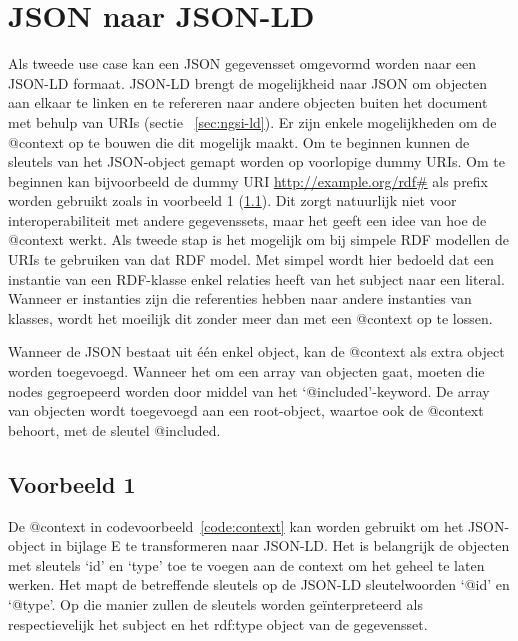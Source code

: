 \section{JSON naar JSON-LD}
\label{sec:json2jsonld}
Als tweede use case kan een JSON gegevensset omgevormd worden naar een JSON-LD formaat. JSON-LD brengt de mogelijkheid naar JSON om objecten aan elkaar te linken en te refereren naar andere objecten buiten het document met behulp van URIs (sectie ~\ref{sec:ngsi-ld}). 
Er zijn enkele mogelijkheden om de @context op te bouwen die dit mogelijk maakt. Om te beginnen kunnen de sleutels van het JSON-object gemapt worden op voorlopige dummy URIs. Om te beginnen kan bijvoorbeeld de dummy URI \url{http://example.org/rdf#} als prefix worden gebruikt zoals in voorbeeld 1 (\ref{subsec:vb1}). Dit zorgt natuurlijk niet voor interoperabiliteit met andere gegevenssets, maar het geeft een idee van hoe de @context werkt.
Als tweede stap is het mogelijk om bij simpele RDF modellen de URIs te gebruiken van dat RDF model. Met simpel wordt hier bedoeld dat een instantie van een RDF-klasse enkel relaties heeft van het subject naar een literal. Wanneer er instanties zijn die referenties hebben naar andere instanties van klasses, wordt het moeilijk dit zonder meer dan met een @context op te lossen.

Wanneer de JSON bestaat uit één enkel object, kan de @context als extra object worden toegevoegd. Wanneer het om een array van objecten gaat, moeten die nodes gegroepeerd worden door middel van het `@included'-keyword. De array van objecten wordt toegevoegd aan een root-object, waartoe ook de @context behoort, met de sleutel @included.

\subsection{Voorbeeld 1}
\label{subsec:vb1}
De @context in codevoorbeeld~\ref{code:context} kan worden gebruikt om het JSON-object in bijlage E te transformeren naar JSON-LD. Het is belangrijk de objecten met sleutels `id' en `type' toe te voegen aan de context om het geheel te laten werken. Het mapt de betreffende sleutels op de JSON-LD sleutelwoorden `@id' en `@type'. Op die manier zullen de sleutels worden geïnterpreteerd als respectievelijk het subject en het rdf:type object van de gegevensset.

